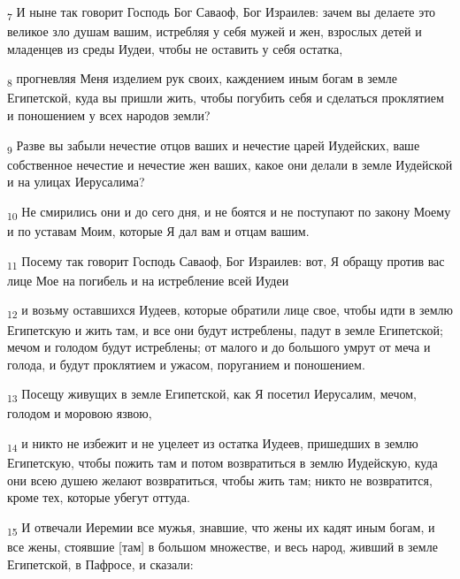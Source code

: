 \begin{tcolorbox}
\textsubscript{7} И ныне так говорит Господь Бог Саваоф, Бог Израилев: зачем вы делаете это великое зло душам вашим, истребляя у себя мужей и жен, взрослых детей и младенцев из среды Иудеи, чтобы не оставить у себя остатка,
\end{tcolorbox}
\begin{tcolorbox}
\textsubscript{8} прогневляя Меня изделием рук своих, каждением иным богам в земле Египетской, куда вы пришли жить, чтобы погубить себя и сделаться проклятием и поношением у всех народов земли?
\end{tcolorbox}
\begin{tcolorbox}
\textsubscript{9} Разве вы забыли нечестие отцов ваших и нечестие царей Иудейских, ваше собственное нечестие и нечестие жен ваших, какое они делали в земле Иудейской и на улицах Иерусалима?
\end{tcolorbox}
\begin{tcolorbox}
\textsubscript{10} Не смирились они и до сего дня, и не боятся и не поступают по закону Моему и по уставам Моим, которые Я дал вам и отцам вашим.
\end{tcolorbox}
\begin{tcolorbox}
\textsubscript{11} Посему так говорит Господь Саваоф, Бог Израилев: вот, Я обращу против вас лице Мое на погибель и на истребление всей Иудеи
\end{tcolorbox}
\begin{tcolorbox}
\textsubscript{12} и возьму оставшихся Иудеев, которые обратили лице свое, чтобы идти в землю Египетскую и жить там, и все они будут истреблены, падут в земле Египетской; мечом и голодом будут истреблены; от малого и до большого умрут от меча и голода, и будут проклятием и ужасом, поруганием и поношением.
\end{tcolorbox}
\begin{tcolorbox}
\textsubscript{13} Посещу живущих в земле Египетской, как Я посетил Иерусалим, мечом, голодом и моровою язвою,
\end{tcolorbox}
\begin{tcolorbox}
\textsubscript{14} и никто не избежит и не уцелеет из остатка Иудеев, пришедших в землю Египетскую, чтобы пожить там и потом возвратиться в землю Иудейскую, куда они всею душею желают возвратиться, чтобы жить там; никто не возвратится, кроме тех, которые убегут оттуда.
\end{tcolorbox}
\begin{tcolorbox}
\textsubscript{15} И отвечали Иеремии все мужья, знавшие, что жены их кадят иным богам, и все жены, стоявшие [там] в большом множестве, и весь народ, живший в земле Египетской, в Пафросе, и сказали:
\end{tcolorbox}
